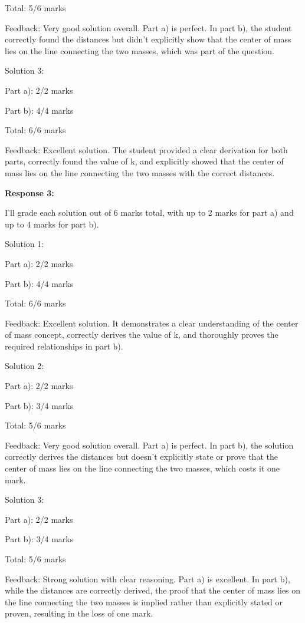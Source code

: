 \documentclass[a4paper,11pt]{article}
\begin{document}
Total: 5/6 marks

Feedback: Very good solution overall. Part a) is perfect. In part b), the student correctly found the distances but didn't explicitly show that the center of mass lies on the line connecting the two masses, which was part of the question.

Solution 3:

Part a): 2/2 marks

Part b): 4/4 marks

Total: 6/6 marks

Feedback: Excellent solution. The student provided a clear derivation for both parts, correctly found the value of k, and explicitly showed that the center of mass lies on the line connecting the two masses with the correct distances.

\bigskip    
\textbf{Response 3:}

I'll grade each solution out of 6 marks total, with up to 2 marks for part a) and up to 4 marks for part b).

Solution 1:

Part a): 2/2 marks

Part b): 4/4 marks

Total: 6/6 marks

Feedback: Excellent solution. It demonstrates a clear understanding of the center of mass concept, correctly derives the value of k, and thoroughly proves the required relationships in part b).

Solution 2:

Part a): 2/2 marks

Part b): 3/4 marks

Total: 5/6 marks

Feedback: Very good solution overall. Part a) is perfect. In part b), the solution correctly derives the distances but doesn't explicitly state or prove that the center of mass lies on the line connecting the two masses, which costs it one mark.

Solution 3:

Part a): 2/2 marks

Part b): 3/4 marks

Total: 5/6 marks

Feedback: Strong solution with clear reasoning. Part a) is excellent. In part b), while the distances are correctly derived, the proof that the center of mass lies on the line connecting the two masses is implied rather than explicitly stated or proven, resulting in the loss of one mark.
\end{document}
